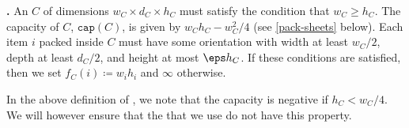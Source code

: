 \textbf{\LContainer.} An \LContainer{} $C$ of dimensions $w_C\times d_C\times h_C$ must satisfy the condition that $w_C\ge h_C$.
The capacity of $C$, $\mathtt{cap}(C)$, is given by $w_Ch_C-w_C^2/4$ (see \cref{pack-sheets} below).
Each item $i$ packed inside $C$ must have some orientation with width at least $w_C/2$, depth at least $d_C/2$, and height at most $\eps h_C$. 
If these conditions are satisfied, then we set $f_C(i)\coloneqq w_ih_i$ and $\infty$ otherwise.

\begin{remark}
    In the above definition of \LContainer, we note that the capacity is negative if $h_C<w_C/4$. We will however ensure that the \LContainers{} that we use do not have this property.
\end{remark}

